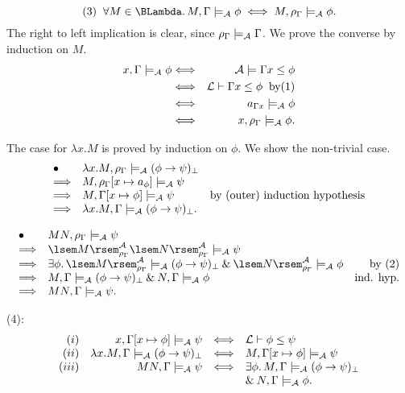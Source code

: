 \[ (3) \;\; \forall M \in \BLambda . \, M, \Gamma \models_{\cal A} \phi \; \Longleftrightarrow \; M, \rho_{\Gamma} \models_{\cal A} \phi . \]
The right to left implication is clear, since $\rho_{\Gamma} \models_{\cal A} \Gamma$. We prove the converse by induction on $M$.
\begin{eqnarray*}
x, \Gamma \models_{\cal A} \phi & \Longleftrightarrow & {\cal A} \models \Gamma x \leq \phi \\
& \Longleftrightarrow & {\cal L} \vdash \Gamma x \leq \phi \;\; {\rm by (1)} \\
& \Longleftrightarrow & a_{\Gamma x} \models_{\cal A} \phi \\
& \Longleftrightarrow & x, \rho_{\Gamma} \models_{\cal A} \phi .
\end{eqnarray*} 

The case for $\lambda x . M$ is proved by induction on $\phi$. We show the non-trivial case.
\[ \begin{array}{llr}
\bullet & \lambda x . M, \rho_{\Gamma} \models_{\cal A} (\phi \rightarrow \psi )_{\bot} & \\
\Longrightarrow & M, \rho_{\Gamma}[x \mapsto a_{\phi}] \models_{\cal A} \psi & \\
\Longrightarrow & M, \Gamma [x \mapsto \phi ] \models_{\cal A} \psi &  \mbox{by (outer) induction hypothesis} \\
\Longrightarrow & \lambda x . M, \Gamma \models_{\cal A} (\phi \rightarrow \psi )_{\bot} . &
\end{array} \]

\[ \begin{array}{llr}
\bullet & MN, \rho_{\Gamma} \models_{\cal A} \psi & \\
\Longrightarrow & \lsem M \rsem^{\cal A}_{\rho_{\Gamma}} \lsem N \rsem^{\cal A}_{\rho_{\Gamma}} \models_{\cal A} \psi & \\
\Longrightarrow & \exists \phi . \, \lsem M \rsem^{\cal A}_{\rho_{\Gamma}} \models_{\cal A} (\phi \rightarrow \psi )_{\bot} \: \& \: \lsem N \rsem^{\cal A}_{\rho_{\Gamma}} \models_{\cal A} \phi & \mbox{by (2)} \\
\Longrightarrow & M, \Gamma \models_{\cal A} (\phi \rightarrow \psi )_{\bot} \: \& \: N, \Gamma \models_{\cal A} \phi & \mbox{ind. hyp.} \\
\Longrightarrow & M N , \Gamma \models_{\cal A} \psi . &
\end{array} \]

\noindent (4):
\[ \begin{array}{rrcl}
(i) & x, \Gamma [x \mapsto \phi ] \models_{\cal A} \psi & \Longleftrightarrow & {\cal L} \vdash \phi \leq \psi \\
(ii) & \lambda x . M , \Gamma \models_{\cal A} (\phi \rightarrow \psi )_{\bot} & \Longleftrightarrow & M, \Gamma [ x \mapsto \phi ] \models_{\cal A} \psi \\
(iii) & MN, \Gamma \models_{\cal A} \psi & \Longleftrightarrow & \exists \phi . \, M, \Gamma \models_{\cal A} (\phi \rightarrow \psi )_{\bot} \\
& & & \mbox{} \& \: N, \Gamma \models_{\cal A} \phi .
\end{array} \]

